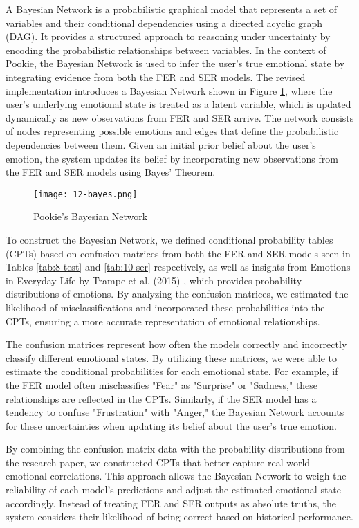 A Bayesian Network is a probabilistic graphical model that represents a set of variables and their conditional dependencies using a directed acyclic graph (DAG). It provides a structured approach to reasoning under uncertainty by encoding the probabilistic relationships between variables. In the context of Pookie, the Bayesian Network is used to infer the user’s true emotional state by integrating evidence from both the FER and SER models. The revised implementation introduces a Bayesian Network shown in Figure \ref{fig:12-bayes}, where the user’s underlying emotional state is treated as a latent variable, which is updated dynamically as new observations from FER and SER arrive. The network consists of nodes representing possible emotions and edges that define the probabilistic dependencies between them. Given an initial prior belief about the user’s emotion, the system updates its belief by incorporating new observations from the FER and SER models using Bayes’ Theorem.

\begin{figure}[!ht]
    \centering
    \texttt{[image: 12-bayes.png]}
    \captionsetup{justification=centering}
    \caption{Pookie’s Bayesian Network}
    \label{fig:12-bayes}
\end{figure}

To construct the Bayesian Network, we defined conditional probability tables (CPTs) based on confusion matrices from both the FER and SER models seen in Tables \ref{tab:8-test} and \ref{tab:10-ser} respectively, as well as insights from Emotions in Everyday Life by Trampe et al. (2015) \cite{10.1371/journal.pone.0145450}, which provides probability distributions of emotions. By analyzing the confusion matrices, we estimated the likelihood of misclassifications and incorporated these probabilities into the CPTs, ensuring a more accurate representation of emotional relationships. 

The confusion matrices represent how often the models correctly and incorrectly classify different emotional states. By utilizing these matrices, we were able to estimate the conditional probabilities for each emotional state. For example, if the FER model often misclassifies "Fear" as "Surprise" or "Sadness," these relationships are reflected in the CPTs. Similarly, if the SER model has a tendency to confuse "Frustration" with "Anger," the Bayesian Network accounts for these uncertainties when updating its belief about the user’s true emotion.

By combining the confusion matrix data with the probability distributions from the research paper, we constructed CPTs that better capture real-world emotional correlations. This approach allows the Bayesian Network to weigh the reliability of each model's predictions and adjust the estimated emotional state accordingly. Instead of treating FER and SER outputs as absolute truths, the system considers their likelihood of being correct based on historical performance.

